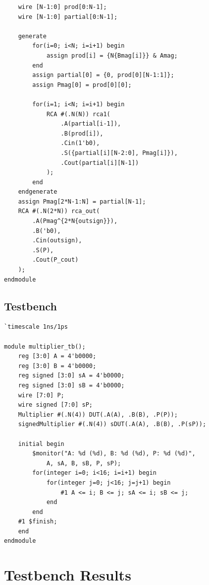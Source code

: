 \documentclass[12pt, titlepage]{report}
\begin{document}
\begin{framed}
\begin{verbatim}
    wire [N-1:0] prod[0:N-1];
    wire [N-1:0] partial[0:N-1];

    generate
        for(i=0; i<N; i=i+1) begin
            assign prod[i] = {N{Bmag[i]}} & Amag;
        end
        assign partial[0] = {0, prod[0][N-1:1]};
        assign Pmag[0] = prod[0][0];
        
        for(i=1; i<N; i=i+1) begin
            RCA #(.N(N)) rca1(
                .A(partial[i-1]),
                .B(prod[i]),
                .Cin(1'b0),
                .S({partial[i][N-2:0], Pmag[i]}),
                .Cout(partial[i][N-1])
            );
        end
    endgenerate
    assign Pmag[2*N-1:N] = partial[N-1];
    RCA #(.N(2*N)) rca_out(
        .A(Pmag^{2*N{outsign}}),
        .B('b0),
        .Cin(outsign),
        .S(P),
        .Cout(P_cout)
    );
endmodule
\end{verbatim}
\end{framed}

\subsection{Testbench}
\begin{framed}
\begin{verbatim}
`timescale 1ns/1ps

module multiplier_tb();
    reg [3:0] A = 4'b0000;
    reg [3:0] B = 4'b0000;
    reg signed [3:0] sA = 4'b0000;
    reg signed [3:0] sB = 4'b0000;
    wire [7:0] P;
    wire signed [7:0] sP;
    Multiplier #(.N(4)) DUT(.A(A), .B(B), .P(P));
    signedMultiplier #(.N(4)) sDUT(.A(A), .B(B), .P(sP));

    initial begin
        $monitor("A: %d (%d), B: %d (%d), P: %d (%d)",
            A, sA, B, sB, P, sP);
        for(integer i=0; i<16; i=i+1) begin
            for(integer j=0; j<16; j=j+1) begin
                #1 A <= i; B <= j; sA <= i; sB <= j;
            end
        end
    #1 $finish;
    end
endmodule

\end{verbatim}
\end{framed}

\section{Testbench Results}
\end{document}
